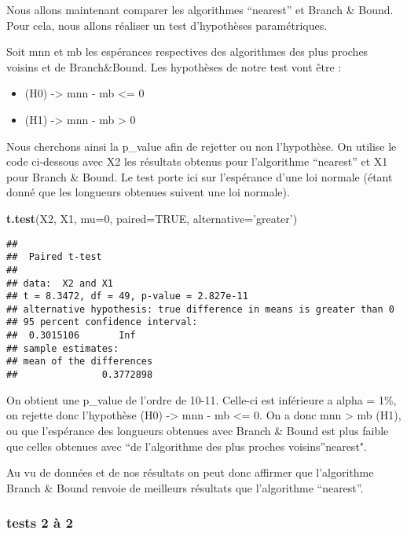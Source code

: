\documentclass[
]{article}
\newenvironment{Shaded}{\begin{snugshade}}{\end{snugshade}}
\newcommand{\DataTypeTok}[1]{\textcolor[rgb]{0.13,0.29,0.53}{#1}}
\newcommand{\DecValTok}[1]{\textcolor[rgb]{0.00,0.00,0.81}{#1}}
\newcommand{\KeywordTok}[1]{\textcolor[rgb]{0.13,0.29,0.53}{\textbf{#1}}}
\newcommand{\NormalTok}[1]{#1}
\newcommand{\OtherTok}[1]{\textcolor[rgb]{0.56,0.35,0.01}{#1}}
\newcommand{\StringTok}[1]{\textcolor[rgb]{0.31,0.60,0.02}{#1}}
\providecommand{\tightlist}{%
  \setlength{\itemsep}{0pt}\setlength{\parskip}{0pt}}
\begin{document}
Nous allons maintenant comparer les algorithmes ``nearest'' et Branch \&
Bound. Pour cela, nous allons réaliser un test d'hypothèses
paramétriques.

Soit mnn et mb les espérances respectives des algorithmes des plus
proches voisins et de Branch\&Bound. Les hypothèses de notre test vont
être :

\begin{itemize}
\tightlist
\item
  (H0) -\textgreater{} mnn - mb \textless= 0
\item
  (H1) -\textgreater{} mnn - mb \textgreater{} 0
\end{itemize}

Nous cherchons ainsi la p\_value afin de rejetter ou non l'hypothèse. On
utilise le code ci-dessous avec X2 les résultats obtenus pour
l'algorithme ``nearest'' et X1 pour Branch \& Bound. Le test porte ici
sur l'espérance d'une loi normale (étant donné que les longueurs
obtenues suivent une loi normale).

\begin{Shaded}
\begin{Highlighting}[]
  \KeywordTok{t.test}\NormalTok{(X2, X1, }\DataTypeTok{mu=}\DecValTok{0}\NormalTok{, }\DataTypeTok{paired=}\OtherTok{TRUE}\NormalTok{, }\DataTypeTok{alternative=}\StringTok{'greater'}\NormalTok{)}
\end{Highlighting}
\end{Shaded}

\begin{verbatim}
## 
##  Paired t-test
## 
## data:  X2 and X1
## t = 8.3472, df = 49, p-value = 2.827e-11
## alternative hypothesis: true difference in means is greater than 0
## 95 percent confidence interval:
##  0.3015106       Inf
## sample estimates:
## mean of the differences 
##               0.3772898
\end{verbatim}

On obtient une p\_value de l'ordre de 10-11. Celle-ci est inférieure a
alpha = 1\%, on rejette donc l'hypothèse (H0) -\textgreater{} mnn - mb
\textless= 0. On a donc mnn \textgreater{} mb (H1), ou que l'espérance
des longueurs obtenues avec Branch \& Bound est plus faible que celles
obtenues avec ``de l'algorithme des plus proches voisins''nearest".

Au vu de données et de nos résultats on peut donc affirmer que
l'algorithme Branch \& Bound renvoie de meilleurs résultats que
l'algorithme ``nearest''.

\hypertarget{tests-2-uxe0-2}{%
\subsubsection{tests 2 à 2}\label{tests-2-uxe0-2}}
\end{document}
